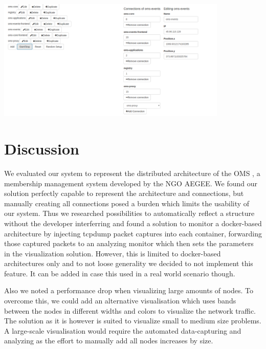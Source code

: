 \documentclass[]{paper}
\begin{document}
\includegraphics[width=11cm]{screenshot2.png}

\section{Discussion}

We evaluated our system to represent the distributed architecture of the OMS \cite{OMS}, a membership management system developed by the NGO AEGEE. We found our solution perfectly capable to represent the architecture and connections, but manually creating all connections posed a burden which limits the usability of our system. Thus we researched possibilities to automatically reflect a structure without the developer interferring and found a solution to monitor a docker-based architecture by injecting tcpdump packet captures into each container, forwarding those captured packets to an analyzing monitor which then sets the parameters in the visualization solution. However, this is limited to docker-based architectures only and to not loose generality we decided to not implement this feature. It can be added in case this used in a real world scenario though.

Also we noted a performance drop when visualizing large amounts of nodes. To overcome this, we could add an alternative visualisation which uses bands between the nodes in different widths and colors to visualize the network traffic. The solution as it is however is suited to visualize small to medium size problems. A large-scale visualisation would require the automated data-capturing and analyzing as the effort to manually add all nodes increases by size.


\end{document}

